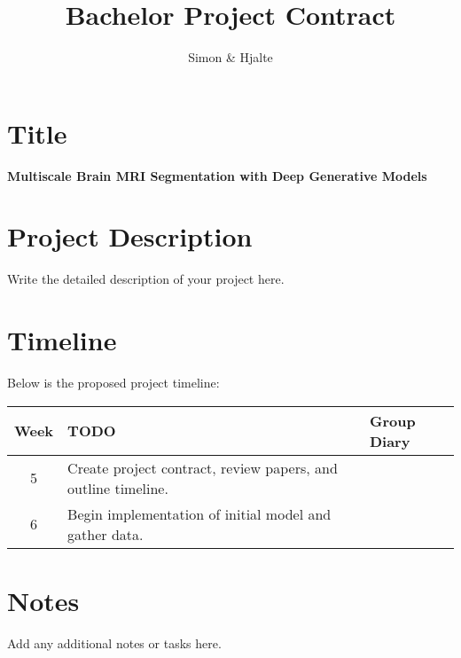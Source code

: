 \documentclass[12pt]{report} %
\begin{document}
\title{Bachelor Project Contract}
\author{Simon \& Hjalte}
\date{}
\maketitle

\section*{Title}
\textbf{Multiscale Brain MRI Segmentation with Deep Generative Models}

\section*{Project Description}
Write the detailed description of your project here.

\section{Timeline}
Below is the proposed project timeline:
\vspace{1em}

\def\arraystretch{1.2} %
\noindent\begin{tabular}{|c|p{11cm}|p{4cm}|}
    \hline
    \textbf{Week} & \textbf{TODO} & \textbf{Group Diary} \\ \hline \hline
    5 & Create project contract, review papers, and outline timeline. & \\ \hline
    6 & Begin implementation of initial model and gather data. & \\ \hline
\end{tabular}

\section*{Notes}
Add any additional notes or tasks here.

 
 
\end{document}
